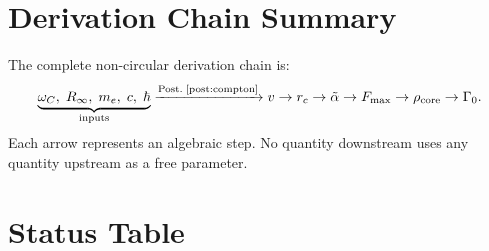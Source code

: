 \documentclass[aps,pra,preprint,longbibliography,nofootinbib]{revtex4-2}
\newcommand{\vc}{v}              %
\newcommand{\rc}{r_c}            %
\newcommand{\omC}{\omega_C}      %
\newcommand{\Rinf}{R_\infty}     %
\newcommand{\Fmax}{F_{\max}}     %
\newcommand{\rhocore}{\rho_{\mathrm{core}}} %
\newcommand{\Gz}{\Gamma_0}       %
\begin{document}
\section{Derivation Chain Summary}
\label{sec:chain}

The complete non-circular derivation chain is:
\begin{equation}
  \underbrace{\omC,\;\Rinf,\;m_e,\;c,\;\hbar}_{\text{inputs}}
  \xrightarrow{\text{Post.\;\ref{post:compton}}}
  \vc
  \rightarrow
  \rc
  \rightarrow
  \tilde\alpha
  \rightarrow
  \Fmax
  \rightarrow
  \rhocore
  \rightarrow
  \Gz.
  \label{eq:chain}
\end{equation}
Each arrow represents an algebraic step.
No quantity downstream uses any quantity upstream as a free parameter.

\section{Status Table}
\label{sec:status}
\end{document}
